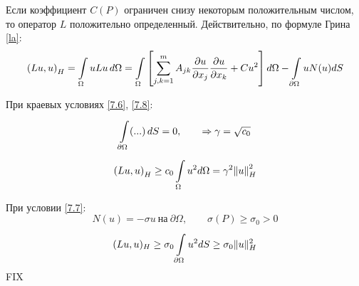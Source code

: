 Если коэффициент $C(P)$ ограничен снизу некоторым положительным числом, то оператор $L$ положительно определенный. Действительно, по формуле Грина \eqref{la}:
\[ {(Lu, u)}_H = \int\limits_{\Omega}^{}u Lu \, d\Omega = \int\limits_{\Omega}^{} \left[\sum\limits_{j,k=1}^{m} A_{jk} \frac{\partial u}{\partial  x_j}\frac{\partial u}{\partial x_k} + C u^2 \right] d\Omega - \int\limits_{\partial \Omega}^{} u N (u) dS \]

При краевых условиях \eqref{7.6}, \eqref{7.8}:
\[ \int\limits_{\partial \Omega}^{}(...) \, dS = 0, \qquad \Rightarrow \gamma = \sqrt{c_0} \]
\[ {(Lu,u)}_H \geq c_0 \int\limits_{\Omega}^{} u^2 d\Omega = \gamma^2 {\|u\|}^2_H \]

При условии \eqref{7.7}:
\[ N(u) = -\sigma u \ \text{на} \ \partial  \Omega, \qquad \sigma (P) \geq \sigma_0 > 0 \]
\[ (Lu, u)_H \geq \sigma_0 \int\limits_{ \partial  \Omega}^{} u^2 dS \geq \sigma_0 \|u\|^2_H \]
FIX

\newpage
